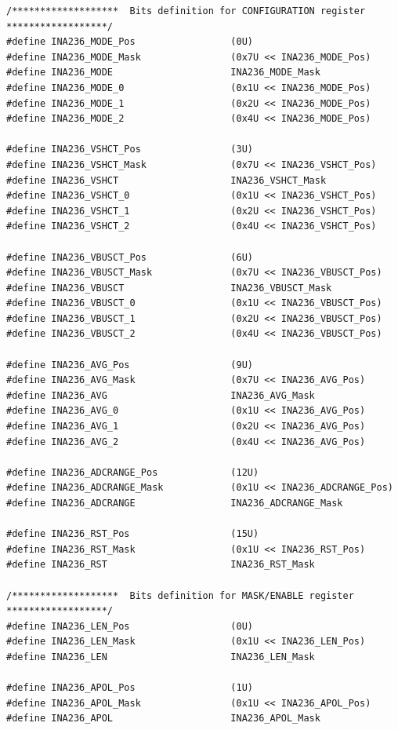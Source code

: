 \documentclass[
10pt, %
a4paper, %
oneside, %
headinclude,footinclude, %
BCOR5mm, %
]{scrartcl}
\begin{document}
\begin{lstlisting}[style=CMakeStyle]
/*******************  Bits definition for CONFIGURATION register  ******************/
#define INA236_MODE_Pos                 (0U)
#define INA236_MODE_Mask                (0x7U << INA236_MODE_Pos)
#define INA236_MODE                     INA236_MODE_Mask
#define INA236_MODE_0                   (0x1U << INA236_MODE_Pos)
#define INA236_MODE_1                   (0x2U << INA236_MODE_Pos)
#define INA236_MODE_2                   (0x4U << INA236_MODE_Pos)

#define INA236_VSHCT_Pos                (3U)
#define INA236_VSHCT_Mask               (0x7U << INA236_VSHCT_Pos)
#define INA236_VSHCT                    INA236_VSHCT_Mask
#define INA236_VSHCT_0                  (0x1U << INA236_VSHCT_Pos)
#define INA236_VSHCT_1                  (0x2U << INA236_VSHCT_Pos)
#define INA236_VSHCT_2                  (0x4U << INA236_VSHCT_Pos)

#define INA236_VBUSCT_Pos               (6U)
#define INA236_VBUSCT_Mask              (0x7U << INA236_VBUSCT_Pos)
#define INA236_VBUSCT                   INA236_VBUSCT_Mask
#define INA236_VBUSCT_0                 (0x1U << INA236_VBUSCT_Pos)
#define INA236_VBUSCT_1                 (0x2U << INA236_VBUSCT_Pos)
#define INA236_VBUSCT_2                 (0x4U << INA236_VBUSCT_Pos)

#define INA236_AVG_Pos                  (9U)
#define INA236_AVG_Mask                 (0x7U << INA236_AVG_Pos)
#define INA236_AVG                      INA236_AVG_Mask
#define INA236_AVG_0                    (0x1U << INA236_AVG_Pos)
#define INA236_AVG_1                    (0x2U << INA236_AVG_Pos)
#define INA236_AVG_2                    (0x4U << INA236_AVG_Pos)

#define INA236_ADCRANGE_Pos             (12U)
#define INA236_ADCRANGE_Mask            (0x1U << INA236_ADCRANGE_Pos)
#define INA236_ADCRANGE                 INA236_ADCRANGE_Mask

#define INA236_RST_Pos                  (15U)
#define INA236_RST_Mask                 (0x1U << INA236_RST_Pos)
#define INA236_RST                      INA236_RST_Mask

/*******************  Bits definition for MASK/ENABLE register  ******************/
#define INA236_LEN_Pos                  (0U)
#define INA236_LEN_Mask                 (0x1U << INA236_LEN_Pos)
#define INA236_LEN                      INA236_LEN_Mask

#define INA236_APOL_Pos                 (1U)
#define INA236_APOL_Mask                (0x1U << INA236_APOL_Pos)
#define INA236_APOL                     INA236_APOL_Mask


\end{lstlisting}
\end{document}
